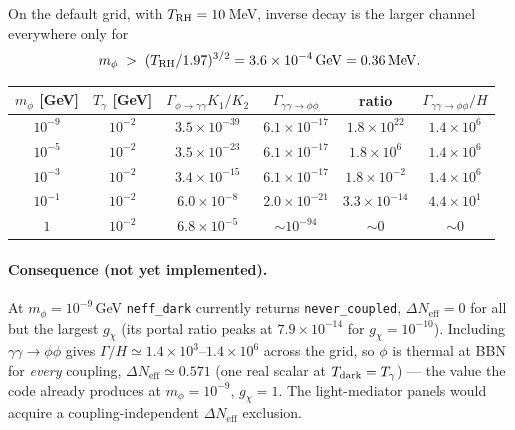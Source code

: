 \documentclass{article}
\newcommand{\Tg}{T_\gamma}
\newcommand{\Ggg}{\Gamma_{\phi\to\gamma\gamma}}
\begin{document}
On the default grid, with $T_{\rm RH}=10\,$MeV, inverse decay is the larger
channel everywhere only for
%
\begin{equation}
  m_\phi \;>\; (T_{\rm RH}/1.97)^{3/2} = 3.6\times10^{-4}\,\mathrm{GeV}
  = 0.36\,\mathrm{MeV}.
\end{equation}
%
\begin{center}
\begin{tabular}{cccccc}
\hline
$m_\phi$ [GeV] & $\Tg$ [GeV] & $\Ggg K_1/K_2$ & $\Gamma_{\gamma\gamma\to\phi\phi}$
 & ratio & $\Gamma_{\gamma\gamma\to\phi\phi}/H$\\
\hline
$10^{-9}$ & $10^{-2}$ & $3.5\times10^{-39}$ & $6.1\times10^{-17}$ & $1.8\times10^{22}$ & $1.4\times10^{6}$\\
$10^{-5}$ & $10^{-2}$ & $3.5\times10^{-23}$ & $6.1\times10^{-17}$ & $1.8\times10^{6}$  & $1.4\times10^{6}$\\
$10^{-3}$ & $10^{-2}$ & $3.4\times10^{-15}$ & $6.1\times10^{-17}$ & $1.8\times10^{-2}$ & $1.4\times10^{6}$\\
$10^{-1}$ & $10^{-2}$ & $6.0\times10^{-8}$  & $2.0\times10^{-21}$ & $3.3\times10^{-14}$& $4.4\times10^{1}$\\
$1$       & $10^{-2}$ & $6.8\times10^{-5}$  & $\sim10^{-94}$      & $\sim0$            & $\sim0$\\
\hline
\end{tabular}
\end{center}

\paragraph{Consequence (not yet implemented).} At $m_\phi=10^{-9}\,$GeV
\texttt{neff\_dark} currently returns \texttt{never\_coupled}, $\Delta N_{\mathrm{eff}}=0$ for
all but the largest $g_\chi$ (its portal ratio peaks at $7.9\times10^{-14}$ for
$g_\chi=10^{-10}$). Including $\gamma\gamma\to\phi\phi$ gives
$\Gamma/H\simeq1.4\times10^{3}$--$1.4\times10^{6}$ across the grid, so $\phi$ is
thermal at BBN for \emph{every} coupling, $\Delta N_{\mathrm{eff}}\simeq0.571$ (one real scalar
at $T_{\rm dark}=\Tg$) --- the value the code already produces at
$m_\phi=10^{-9}$, $g_\chi=1$. The light-mediator panels would acquire a
coupling-independent $\Delta N_{\mathrm{eff}}$ exclusion.
\end{document}

